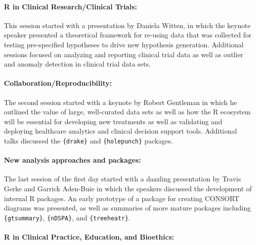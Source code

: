 \hypertarget{r-in-clinical-researchclinical-trials}{%
\paragraph{R in Clinical Research/Clinical
Trials:}\label{r-in-clinical-researchclinical-trials}}

This session started with a presentation by Daniela Witten, in which the
keynote speaker presented a theoretical framework for re-using data that
was collected for testing pre-specified hypotheses to drive new
hypothesis generation. Additional sessions focused on analyzing and
reporting clinical trial data as well as outlier and anomaly detection
in clinical trial data sets.

\hypertarget{collaborationreproducibility}{%
\paragraph{Collaboration/Reproducibility:}\label{collaborationreproducibility}}

The second session started with a keynote by Robert Gentleman in which
he outlined the value of large, well-curated data sets as well as how
the R ecosystem will be essential for developing new treatments as well
as validating and deploying healthcare analytics and clinical decision
support tools. Additional talks discussed the \texttt{\{drake\}} and
\texttt{\{holepunch\}} packages.

\hypertarget{new-analysis-approaches-and-packages}{%
\paragraph{New analysis approaches and
packages:}\label{new-analysis-approaches-and-packages}}

The last session of the first day started with a dazzling presentation
by Travis Gerke and Garrick Aden-Buie in which the speakers discussed
the development of internal R packages. An early prototype of a package
for creating CONSORT diagrams was presented, as well as summaries of
more mature packages including \texttt{\{gtsummary\}},
\texttt{\{nDSPA\}}, and \texttt{\{treeheatr\}}.

\hypertarget{r-in-clinical-practice-education-and-bioethics}{%
\paragraph{R in Clinical Practice, Education, and
Bioethics:}\label{r-in-clinical-practice-education-and-bioethics}}

